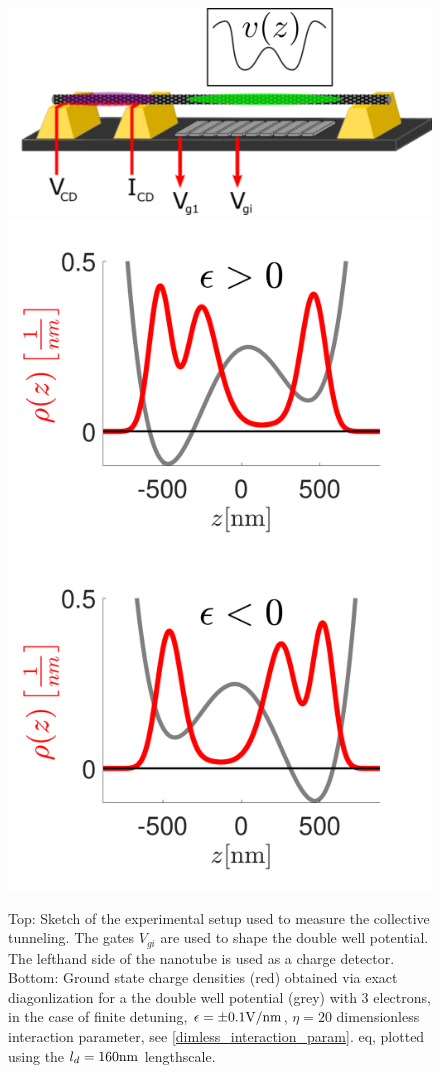 \documentclass[prb,twocolumn,showpacs,preprintnumbers,amsmath,amssymb, superscriptaddress]{revtex4-2}
\newcommand{\1}{{1\hspace*{-0.5ex} \textrm{l} \hspace*{0.5ex}}}
\begin{document}
\begin{figure}[h!]
    \begin{center}
     \includegraphics[width=0.7\columnwidth]{Experimental_Setup.png}
     \vskip 10pt
     \includegraphics[width=0.49\columnwidth]{Fig_WaveFunction_Potential_NegEps_v1}
     \includegraphics[width=0.49\columnwidth]{Fig_WaveFunction_Potential_PosEps}
    \end{center}
    \caption{Top: Sketch of  the experimental setup used to measure the
	 collective tunneling. The gates  
	 $V_{gi}$ are used to shape the double well potential. 
	 The lefthand side of the nanotube is used as a charge detector. 
	 Bottom: Ground state charge densities  (red) obtained via exact diagonlization  for a the double well potential (grey) with 3 electrons, in the case of finite detuning, $\epsilon = \pm 0.1 {\rm{ V/nm}}$, $\eta = 20$ dimensionless interaction parameter, see \eqref{dimless_interaction_param}. eq, plotted using the $l_d = 160 {\rm{ nm}}$ lengthscale.}
     \label{fig:experimental_setup}
\end{figure}
  
\end{document}
